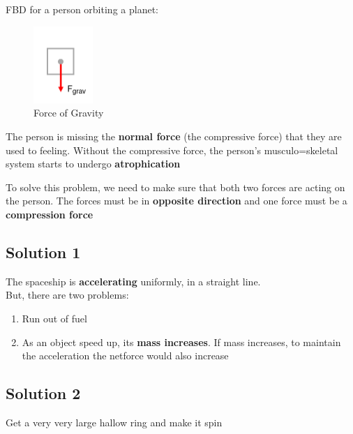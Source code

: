 FBD for a person orbiting a planet:
\begin{paracol}{2}
    \begin{leftcolumn}
        \begin{figure}
            \centering
            \includegraphics[width=0.2\textwidth]{graph/FBD2.png}
            \caption{Force of Gravity}
        \end{figure}
    \end{leftcolumn}
    \begin{rightcolumn}
        The person is missing the \textbf{normal force} (the compressive force) that they are used to feeling. 
        Without the compressive force, the person's musculo=skeletal system starts to undergo \textbf{atrophication}
    \end{rightcolumn}
\end{paracol}

To solve this problem, we need to make sure that both two forces are acting on the person. The forces must 
be in \textbf{opposite direction} and one force must be a \textbf{compression force}\\

\subsection*{Solution 1}
The spaceship is \textbf{accelerating} uniformly, in a straight line.\\

But, there are two problems:
\begin{enumerate}
    \item Run out of fuel
    \item As an object speed up, its \textbf{mass increases}. If mass increases, to maintain the acceleration the netforce would also increase
\end{enumerate}

\subsection*{Solution 2}
Get a very very large hallow ring and make it spin\\

